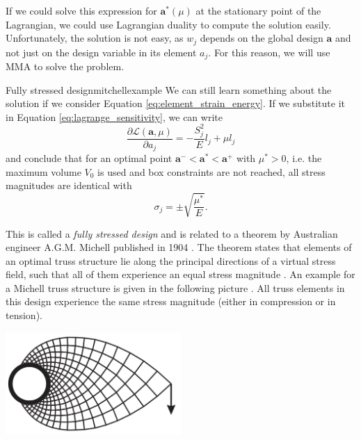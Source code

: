 If we could solve this expression for $\mathbf{a}^*(\mu)$ at the stationary point of the Lagrangian, we could use Lagrangian duality to compute the solution easily. Unfortunately, the solution is not easy, as $w_j$ depends on the global design $\mathbf{a}$ and not just on the design variable in its element $a_j$. For this reason, we will use MMA to solve the problem.

\begin{example}{Fully stressed design}{mitchellexample}
    We can still learn something about the solution if we consider Equation \eqref{eq:element_strain_energy}. If we substitute it in Equation \eqref{eq:lagrange_sensitivity}, we can write 
    \begin{equation}
        \frac{\partial \mathcal{L} (\mathbf{a}, \mu)}{\partial a_j} = - \frac{S^2_j}{E} l_j + \mu l_j
    \end{equation}
    and conclude that for an optimal point $\mathbf{a}^- < \mathbf{a}^* < \mathbf{a}^+$ with $\mu^*>0$, i.e. the maximum volume $V_0$ is used and box constraints are not reached, all stress magnitudes are identical with
    \begin{equation}
        \sigma_j = \pm \sqrt{\frac{\mu^*}{E}}.
    \end{equation}
    
    This is called a \emph{fully stressed design} and is related to a theorem by Australian engineer A.G.M. Michell published in 1904 \cite{Michell1904}. The theorem states that elements of an optimal truss structure lie along the principal directions of a virtual stress field, such that all of them experience an equal stress magnitude \cite{Arora2019}.
    An example for a Michell truss structure is given in the following picture \cite{Picelli2015}. All truss elements in this design experience the same stress magnitude (either in compression or in tension).
    \begin{center}
        \includegraphics[width=0.5\textwidth]{figures/michell.png}
    \end{center}
    
\end{example}

